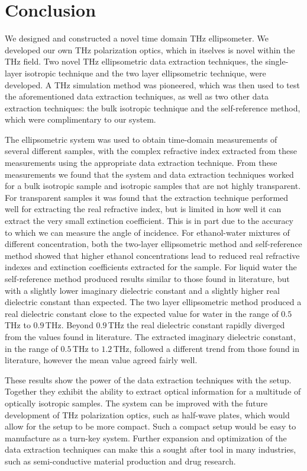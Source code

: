 \chapter{Conclusion}
\label{chp:Conclusion}

We designed and constructed a novel time domain THz ellipsometer. We developed our own THz polarization optics, which in itselves is novel within the THz field. Two novel THz ellipsometric data extraction techniques, the single-layer isotropic technique and the two layer ellipsometric technique, were developed. A THz simulation method was pioneered, which was then used to test the aforementioned data extraction techniques, as well as two other data extraction techniques: the bulk isotropic technique and the self-reference method, which were complimentary to our system.

The ellipsometric system was used to obtain time-domain measurements of several different samples, with the complex refractive index extracted from these measurements using the appropriate data extraction technique. From these measurements we found that the system and data extraction techniques worked for a bulk isotropic sample and isotropic samples that are not highly transparent. For transparent samples it was found that the extraction technique performed well for extracting the real refractive index, but is limited in how well it can extract the very small extinction coefficient. This is in part due to the accuracy to which we can measure the angle of incidence. For ethanol-water mixtures of different concentration, both the two-layer ellipsometric method and self-reference method showed that higher ethanol concentrations lead to reduced real refractive indexes and extinction coefficients extracted for the sample. For liquid water the self-reference method produced results similar to those found in literature, but with a slightly lower imaginary dielectric constant and a slightly higher real dielectric constant than expected. 
The two layer ellipsometric method produced a real dielectric constant close to the expected value for water in the range of $0.5\,$THz to $0.9\,$THz. Beyond $0.9\,$THz the real dielectric constant rapidly diverged from the values found in literature.
The extracted imaginary dielectric constant, in the range of $0.5\,$THz to $1.2\,$THz, followed a different trend from those found in literature, however the mean value agreed fairly well.

These results show the power of the data extraction techniques with the setup. Together they exhibit the ability to extract optical information for a multitude of optically isotropic samples. The system can be improved with the future development of THz polarization optics, such as half-wave plates, which would allow for the setup to be more compact. Such a compact setup would be easy to manufacture as a turn-key system. Further expansion and optimization of the data extraction techniques can make this a sought after tool in many industries, such as semi-conductive material production and drug research.

